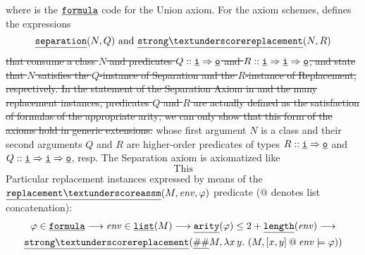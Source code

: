 where  is the $\formula$ code for the
Union axiom. For the axiom schemes,  defines
the expressions
\[
  \isatt{separation}(N,Q)
  \text{ and }
  \isatt{strong{\uscore}replacement}(N,R)
\]
\sout{that consume a class $N$ and predicates $Q::\tyi\fun\tyo$ and $R::\tyi\fun\tyi\fun\tyo$, and state that $N$
satisfies the $Q$-instance of Separation and the $R$-instance of
Replacement, respectively.
In the statement of the Separation Axiom in
 and
the many replacement instances, predicates $Q$ and $R$ are actually
defined as the satisfaction of formulas of the appropriate arity; we can only show
that this form of the axioms hold in generic extensions.}
whose first argument $N$ is a class and their second arguments $Q$ and
$R$ are higher-order predicates of types $R :: \tyi \fun \tyo$ and $Q ::
\tyi \fun \tyi \fun \tyo$, resp.
The Separation axiom is axiomatized like
\[
  \text{This}
\]
Particular replacement instances expressed by means of the
$\isatt{replacement{\uscore}assm}(M,\mathit{env},\phi)$ predicate ($@$ denotes
list concatenation):
\begin{multline}\label{eq:replacement_assm_def}
\varphi \in \formula  \limp \mathit{env} \in \isatt{list}(M) \limp \isatt{arity}(\varphi) \leq 2+ \isatt{length}(\mathit{env}) \limp \\
 \isatt{strong{\uscore}replacement}(\isatt{\#\#} M, \lambda x\, y.\ (M, [x,y]
\mathbin{@} \mathit{env}  \models \varphi))
\end{multline}
